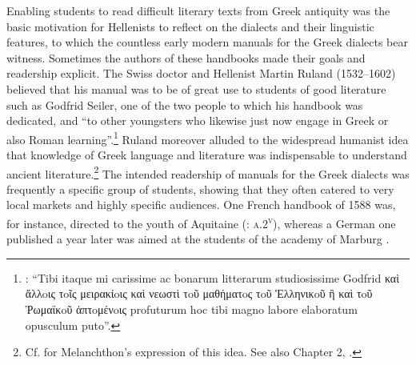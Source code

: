 Enabling students to read difficult literary texts from Greek antiquity was the basic motivation for Hellenists to reflect on the dialects and their linguistic features, to which the countless early modern manuals for the Greek dialects bear witness. Sometimes the authors of these handbooks made their goals and readership explicit. The Swiss doctor and Hellenist Martin Ruland (1532–1602) believed that his manual was to be of great use to students of good literature such as Godfrid Seiler, one of the two people to which his handbook was dedicated, and “to other youngsters who likewise just now engage in Greek or also Roman learning”.\footnote{\citet[α.4\textsc{\textsuperscript{v}}]{Ruland1556}: “Tibi itaque mi carissime ac bonarum litterarum studiosissime Godfrid καὶ ἄλλoις τoῖς μειρακίoις καὶ νεωστὶ τoῦ μαθήματoς τoῦ Ἑλληνικoῦ ἢ καὶ τoῦ Ῥωμαϊκoῦ ἁπτoμένoις profuturum hoc tibi magno labore elaboratum opusculum puto”.} Ruland moreover alluded to the widespread humanist idea that knowledge of Greek language and literature was indispensable to understand ancient  literature.\footnote{Cf. \citet[139]{Ben-Tov2009} for Melanchthon’s expression of this idea. See also Chapter 2, .} The intended readership of manuals for the Greek dialects was frequently a specific group of students, showing that they often catered to very local markets and highly specific audiences. One French handbook of 1588 was, for instance, directed to the youth of Aquitaine (\citealt{Baile1588}: \textsc{a.2}\textsc{\textsuperscript{v}}), whereas a German one published a year later was aimed at the students of the academy of Marburg \citep{Walper1589}.

